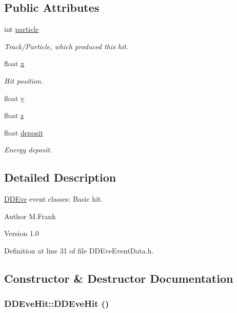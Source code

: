 \subsection*{Public Attributes}
\begin{DoxyCompactItemize}
\item 
int \hyperlink{class_d_d4hep_1_1_d_d_eve_hit_a35b41dfc3b314771711c4b35ba1145f5}{particle}
\begin{DoxyCompactList}\small\item\em Track/Particle, which produced this hit. \item\end{DoxyCompactList}\item 
float \hyperlink{class_d_d4hep_1_1_d_d_eve_hit_aa43de1b526423ff9a1dd54ac140b6941}{x}
\begin{DoxyCompactList}\small\item\em Hit position. \item\end{DoxyCompactList}\item 
float \hyperlink{class_d_d4hep_1_1_d_d_eve_hit_a4eb2c75de026adb1bc8d73267c8a3fb4}{y}
\item 
float \hyperlink{class_d_d4hep_1_1_d_d_eve_hit_affe739f66c56ced8a7d79b5c736f3b21}{z}
\item 
float \hyperlink{class_d_d4hep_1_1_d_d_eve_hit_ad45cf3f4b4496c2b6db9de03ce77b4a6}{deposit}
\begin{DoxyCompactList}\small\item\em Energy deposit. \item\end{DoxyCompactList}\end{DoxyCompactItemize}


\subsection{Detailed Description}
\hyperlink{struct_d_d4hep_1_1_d_d_eve}{DDEve} event classes: Basic hit. \begin{DoxyAuthor}{Author}
M.Frank 
\end{DoxyAuthor}
\begin{DoxyVersion}{Version}
1.0 
\end{DoxyVersion}


Definition at line 31 of file DDEveEventData.h.

\subsection{Constructor \& Destructor Documentation}
\hypertarget{class_d_d4hep_1_1_d_d_eve_hit_a29f91ae5157d9d45c12b233b9a70cd98}{
\subsubsection[{DDEveHit}]{\setlength{\rightskip}{0pt plus 5cm}DDEveHit::DDEveHit ()}}
\label{class_d_d4hep_1_1_d_d_eve_hit_a29f91ae5157d9d45c12b233b9a70cd98}



